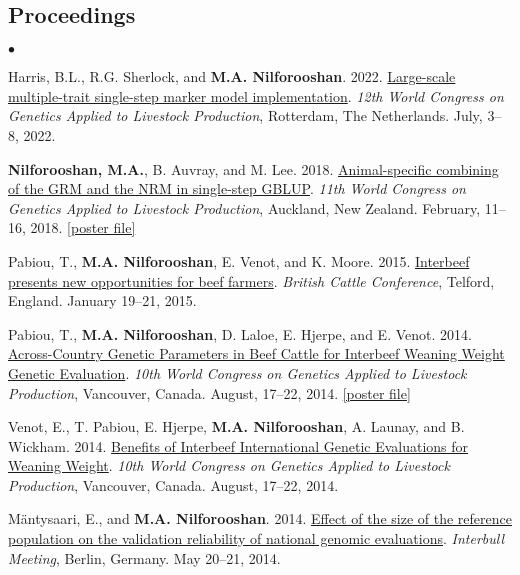 \documentclass[margin,line]{res}
\newenvironment{list2}{
  \begin{list}{$\bullet$}{%
      \setlength{\itemsep}{0in}
      \setlength{\parsep}{0in} \setlength{\parskip}{0in}
      \setlength{\topsep}{0in} \setlength{\partopsep}{0in}
      \setlength{\leftmargin}{0.2in}}}{\end{list}}
\begin{document}
\begin{resume}
\section{\sc Proceedings}

\begin{list2}
\item Harris, B.L., R.G. Sherlock, and {\bf M.A. Nilforooshan}. 2022. \href{https://www.wageningenacademic.com/pb-assets/wagen/WCGALP2022/19_016.pdf}{Large-scale multiple-trait single-step marker model implementation}. {\em 12th World Congress on Genetics Applied to Livestock Production}, Rotterdam, The Netherlands. July, 3--8, 2022.
\item {\bf Nilforooshan, M.A.}, B. Auvray, and M. Lee. 2018. \href{https://www.researchgate.net/publication/358198782_Animal-specific_combining_of_the_GRM_and_the_NRM_in_single-step_GBLUP}{Animal-specific combining of the GRM and the NRM in single-step GBLUP}. {\em 11th World Congress on Genetics Applied to Livestock Production}, Auckland, New Zealand. February, 11--16, 2018. \href{https://doi.org/10.13140/RG.2.2.25768.03843}{[poster file]}
\item Pabiou, T., {\bf M.A. Nilforooshan}, E. Venot, and  K. Moore. 2015. \href{https://www.researchgate.net/publication/358198790_Interbeef_presents_new_opportunities_for_beef_farmers}{Interbeef presents new opportunities for beef farmers}. {\em British Cattle Conference}, Telford, England. January 19--21, 2015.
\item Pabiou, T., {\bf M.A. Nilforooshan}, D. Laloe, E. Hjerpe, and E. Venot. 2014. \href{https://www.researchgate.net/publication/268110020_ACROSS-COUNTRY_GENETIC_PARAMETERS_IN_BEEF_CATTLE_FOR_INTERBEEF_WEANING_WEIGHT_GENETIC_EVALUATION}{Across-Country Genetic Parameters in Beef Cattle for Interbeef Weaning Weight Genetic Evaluation}. {\em 10th World Congress on Genetics Applied to Livestock Production}, Vancouver, Canada. August, 17--22, 2014. \href{http://dx.doi.org/10.13140/RG.2.2.33036.80003}{[poster file]}
\item Venot, E., T. Pabiou, E. Hjerpe, {\bf M.A. Nilforooshan}, A. Launay, and B. Wickham. 2014. \href{https://www.researchgate.net/publication/268109933_Benefits_of_Interbeef_international_genetic_evaluations_for_weaning_weight}{Benefits of Interbeef International Genetic Evaluations for Weaning Weight}. {\em 10th World Congress on Genetics Applied to Livestock Production}, Vancouver, Canada. August, 17--22, 2014.
\item M\"{a}ntysaari, E., and {\bf M.A. Nilforooshan}. 2014. \href{https://drive.google.com/file/d/0B2l_izQwJmVpY3B1dTRtMmlWV1E/view?usp=sharing&resourcekey=0-noBm5g1J1txJWu7nFhvD1A}{Effect of the size of the reference population on the validation reliability of national genomic evaluations}. {\em Interbull Meeting}, Berlin, Germany. May 20--21, 2014.

\end{list2}
\end{resume}
\end{document}
